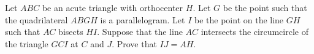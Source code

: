 Let $ABC$ be an acute triangle with orthocenter $H$. Let $G$ be the point such that the quadrilateral $ABGH$ is a parallelogram. Let $I$ be the point on the line $GH$ such that $AC$ bisects $HI$. Suppose that the line $AC$ intersects the circumcircle of the triangle $GCI$ at $C$ and $J$. Prove that $IJ = AH$.
